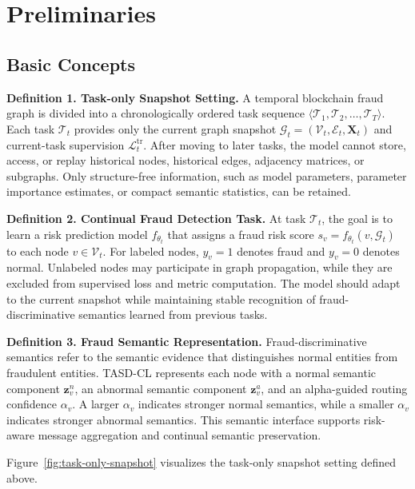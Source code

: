 \section{Preliminaries}
\label{sec:preliminaries}

\subsection{Basic Concepts}
\label{subsec:basic-concepts}

\noindent\textbf{Definition 1. Task-only Snapshot Setting.}
A temporal blockchain fraud graph is divided into a chronologically ordered task sequence $\langle \mathcal{T}_1,\mathcal{T}_2,\ldots,\mathcal{T}_T\rangle$. Each task $\mathcal{T}_t$ provides only the current graph snapshot $\mathcal{G}_t=(\mathcal{V}_t,\mathcal{E}_t,\mathbf{X}_t)$ and current-task supervision $\mathcal{L}^{\mathrm{tr}}_t$. After moving to later tasks, the model cannot store, access, or replay historical nodes, historical edges, adjacency matrices, or subgraphs. Only structure-free information, such as model parameters, parameter importance estimates, or compact semantic statistics, can be retained.

\noindent\textbf{Definition 2. Continual Fraud Detection Task.}
At task $\mathcal{T}_t$, the goal is to learn a risk prediction model $f_{\theta_t}$ that assigns a fraud risk score $s_v=f_{\theta_t}(v,\mathcal{G}_t)$ to each node $v\in\mathcal{V}_t$. For labeled nodes, $y_v=1$ denotes fraud and $y_v=0$ denotes normal. Unlabeled nodes may participate in graph propagation, while they are excluded from supervised loss and metric computation. The model should adapt to the current snapshot while maintaining stable recognition of fraud-discriminative semantics learned from previous tasks.

\noindent\textbf{Definition 3. Fraud Semantic Representation.}
Fraud-discriminative semantics refer to the semantic evidence that distinguishes normal entities from fraudulent entities. TASD-CL represents each node with a normal semantic component $\mathbf{z}^{n}_v$, an abnormal semantic component $\mathbf{z}^{a}_v$, and an alpha-guided routing confidence $\alpha_v$. A larger $\alpha_v$ indicates stronger normal semantics, while a smaller $\alpha_v$ indicates stronger abnormal semantics. This semantic interface supports risk-aware message aggregation and continual semantic preservation.

Figure~\ref{fig:task-only-snapshot} visualizes the task-only snapshot setting defined above.

